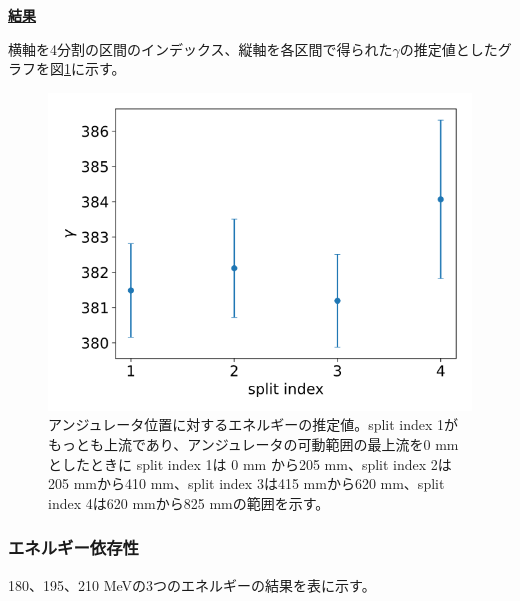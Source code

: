 \documentclass[a4paper,11pt,uplatex]{jsbook}
\begin{document}
\noindent \textbf{\underline{結果}}\par
横軸を4分割の区間のインデックス、縦軸を各区間で得られた$\gamma$の推定値としたグラフを図\ref{posdep}に示す。
\begin{figure}[h]
  \centering
  \includegraphics[width=0.8\linewidth]{image/4-posdep.png}
  \caption[アンジュレータ位置に対するエネルギーの推定値]{アンジュレータ位置に対するエネルギーの推定値。split index 1がもっとも上流であり、アンジュレータの可動範囲の最上流を0 mm としたときに
  split index 1は 0 mm から205 mm、split index 2は205 mmから410 mm、split index 3は415 mmから620 mm、split index 4は620 mmから825 mmの範囲を示す。}\label{posdep}
\end{figure}

\subsubsection{エネルギー依存性}
180、195、210 MeVの3つのエネルギーの結果を表に示す。
\end{document}

